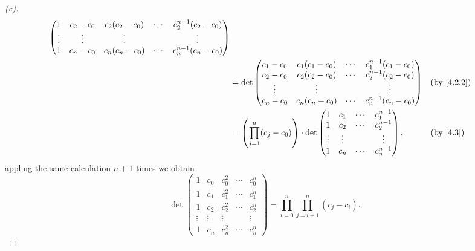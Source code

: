 \begin{proof}[(c)]
\begin{align*}
\begin{pmatrix}
               1      & c_2 - c_0 & c_2 (c_2 - c_0) & \cdots & c_2^{n - 1} (c_2 - c_0) \\
               \vdots & \vdots    & \vdots          &        & \vdots                  \\
               1      & c_n - c_0 & c_n (c_n - c_0) & \cdots & c_n^{n - 1} (c_n - c_0)
             \end{pmatrix}                         \\
     & = \det\begin{pmatrix}
               c_1 - c_0 & c_1 (c_1 - c_0) & \cdots & c_1^{n - 1} (c_1 - c_0) \\
               c_2 - c_0 & c_2 (c_2 - c_0) & \cdots & c_2^{n - 1} (c_2 - c_0) \\
               \vdots    & \vdots          &        & \vdots                  \\
               c_n - c_0 & c_n (c_n - c_0) & \cdots & c_n^{n - 1} (c_n - c_0)
             \end{pmatrix}          &  & \text{(by \cref{4.2.2})}                                  \\
     & = \pa{\prod_{j = 1}^n (c_j - c_0)} \cdot \det\begin{pmatrix}
                                                      1      & c_1    & \cdots & c_1^{n - 1} \\
                                                      1      & c_2    & \cdots & c_2^{n - 1} \\
                                                      \vdots & \vdots &        & \vdots      \\
                                                      1      & c_n    & \cdots & c_n^{n - 1}
                                                    \end{pmatrix},               &  & \text{(by \cref{4.3})}
  \end{align*}
  appling the same calculation \(n + 1\) times we obtain
  \[
    \det\begin{pmatrix}
      1      & c_0    & c_0^2  & \cdots & c_0^n  \\
      1      & c_1    & c_1^2  & \cdots & c_1^n  \\
      1      & c_2    & c_2^2  & \cdots & c_2^n  \\
      \vdots & \vdots & \vdots &        & \vdots \\
      1      & c_n    & c_n^2  & \cdots & c_n^n
    \end{pmatrix} = \prod_{i = 0}^n \prod_{j = i + 1}^n (c_j - c_i).
  \]
\end{proof}

